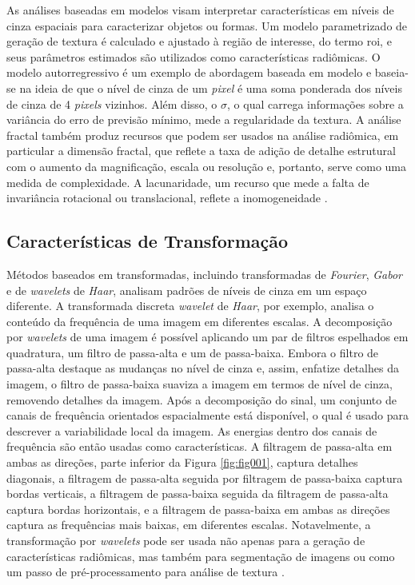 As análises baseadas em modelos visam interpretar características em níveis de cinza espaciais para caracterizar objetos ou formas. Um modelo parametrizado de geração de textura é calculado e ajustado à região de interesse, do termo \gls{roi}, e seus parâmetros estimados são utilizados como características radiômicas. O modelo autorregressivo é um exemplo de abordagem baseada em modelo e baseia-se na ideia de que o nível de cinza de um \textit{pixel} é uma soma ponderada dos níveis de cinza de 4 \textit{pixels} vizinhos. Além disso, o $\sigma$, o qual carrega informações sobre a variância do erro de previsão mínimo, mede a regularidade da textura. A análise fractal também produz recursos que podem ser usados na análise radiômica, em particular a dimensão fractal, que reflete a taxa de adição de detalhe estrutural com o aumento da magnificação, escala ou resolução e, portanto, serve como uma medida de complexidade. A lacunaridade, um recurso que mede a falta de invariância rotacional ou translacional, reflete a inomogeneidade \cite{mayerhoeferIntroductionRadiomics2020}.

\subsection{Características de Transformação}
Métodos baseados em transformadas, incluindo transformadas de \textit{Fourier}, \textit{Gabor} e de \textit{wavelets} de \textit{Haar}, analisam padrões de níveis de cinza em um espaço diferente. A transformada discreta \textit{wavelet} de \textit{Haar}, por exemplo, analisa o conteúdo da frequência de uma imagem em diferentes escalas. A decomposição por \textit{wavelets} de uma imagem é possível aplicando um par de filtros espelhados em quadratura, um filtro de passa-alta e um de passa-baixa. Embora o filtro de passa-alta destaque as mudanças no nível de cinza e, assim, enfatize detalhes da imagem, o filtro de passa-baixa suaviza a imagem em termos de nível de cinza, removendo detalhes da imagem. Após a decomposição do sinal, um conjunto de canais de frequência orientados espacialmente está disponível, o qual é usado para descrever a variabilidade local da imagem. As energias dentro dos canais de frequência são então usadas como características. A filtragem de passa-alta em ambas as direções, parte inferior da Figura \ref{fig:fig001}, captura detalhes diagonais, a filtragem de passa-alta seguida por filtragem de passa-baixa captura bordas verticais, a filtragem de passa-baixa seguida da filtragem de passa-alta captura bordas horizontais, e a filtragem de passa-baixa em ambas as direções captura as frequências mais baixas, em diferentes escalas. Notavelmente, a transformação por \textit{wavelets} pode ser usada não apenas para a geração de características radiômicas, mas também para segmentação de imagens ou como um passo de pré-processamento para análise de textura \cite{mayerhoeferIntroductionRadiomics2020}.

